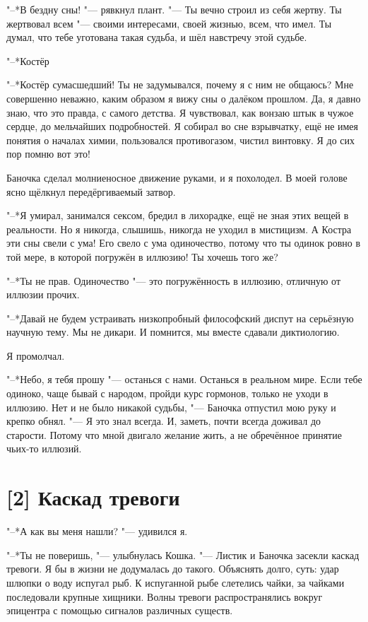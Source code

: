 "--*В бездну сны! "--- рявкнул плант.
"--- Ты вечно строил из себя жертву.
Ты жертвовал всем "--- своими интересами, своей жизнью, всем, что имел.
Ты думал, что тебе уготована такая судьба, и шёл навстречу этой судьбе.

"--*Костёр\ldotst

"--*Костёр сумасшедший!
Ты не задумывался, почему я с ним не общаюсь?
Мне совершенно неважно, каким образом я вижу сны о далёком прошлом.
Да, я давно знаю, что это правда, с самого детства.
Я чувствовал, как вонзаю штык в чужое сердце, до мельчайших подробностей.
Я собирал во сне взрывчатку, ещё не имея понятия о началах химии, пользовался противогазом, чистил винтовку.
Я до сих пор помню вот это!

Баночка сделал молниеносное движение руками, и я похолодел.
В моей голове ясно щёлкнул передёргиваемый затвор.

"--*Я умирал, занимался сексом, бредил в лихорадке, ещё не зная этих вещей в реальности.
Но я никогда, слышишь, никогда не уходил в мистицизм.
А Костра эти сны свели с ума!
Его свело с ума одиночество, потому что ты одинок ровно в той мере, в которой погружён в иллюзию!
Ты хочешь того же?

"--*Ты не прав.
Одиночество "--- это погружённость в иллюзию, отличную от иллюзии прочих.

"--*Давай не будем устраивать низкопробный философский диспут на серьёзную научную тему.
Мы не дикари.
И помнится, мы вместе сдавали диктиологию.

Я промолчал.

"--*Небо, я тебя прошу "--- останься с нами.
Останься в реальном мире.
Если тебе одиноко, чаще бывай с народом, пройди курс гормонов, только не уходи в иллюзию.
Нет и не было никакой судьбы, "--- Баночка отпустил мою руку и крепко обнял.
"--- Я это знал всегда.
И, заметь, почти всегда доживал до старости.
Потому что мной двигало желание жить, а не обречённое принятие чьих-то иллюзий.

\section{[2] Каскад тревоги}

"--*А как вы меня нашли? "--- удивился я.

"--*Ты не поверишь, "--- улыбнулась Кошка.
"--- Листик и Баночка засекли каскад тревоги.
Я бы в жизни не додумалась до такого.
Объяснять долго, суть: удар шлюпки о воду испугал рыб.
К испуганной рыбе слетелись чайки, за чайками последовали крупные хищники.
Волны тревоги распространялись вокруг эпицентра с помощью сигналов различных существ.

